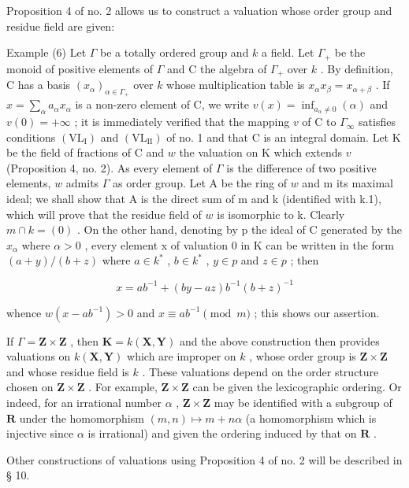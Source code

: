 Proposition 4 of no. 2 allows us to construct a valuation whose order group and residue field are given:

Example (6) Let \(\Gamma\) be a totally ordered group and \(k\) a field. Let \(\Gamma_{+}\) be the monoid of positive elements of \(\Gamma\) and C the algebra of \(\Gamma_{+}\) over \(k\) . By definition, C has a basis \((x_{\alpha})_{\alpha \in \Gamma_{+}}\) over \(k\) whose multiplication table is \(x_{\alpha}x_{\beta} = x_{\alpha +\beta}\) . If \(x = \sum_{\alpha}a_{\alpha}x_{\alpha}\) is a non-zero element of C, we write \(v(x) = \inf_{a_{\alpha}\neq 0}(\alpha)\) and \(v(0) = +\infty\) ; it is immediately verified that the mapping \(v\) of C to \(\Gamma_{\infty}\) satisfies conditions \((\mathrm{VL}_{\mathrm{I}})\) and \((\mathrm{VL}_{\mathrm{II}})\) of no. 1 and that C is an integral domain. Let K be the field of fractions of C and \(w\) the valuation on K which extends \(v\) (Proposition 4, no. 2). As every element of \(\Gamma\) is the difference of two positive elements, \(w\) admits \(\Gamma\) as order group. Let A be the ring of \(w\) and m its maximal ideal; we shall show that A is the direct sum of m and k (identified with k.1), which will prove that the residue field of \(w\) is isomorphic to k. Clearly \(m \cap k = (0)\) . On the other hand, denoting by p the ideal of C generated by the \(x_{\alpha}\) where \(\alpha > 0\) , every element x of valuation 0 in K can be written in the form \((a + y)/(b + z)\) where \(a \in k^{*}\) , \(b \in k^{*}\) , \(y \in p\) and \(z \in p\) ; then

\[
x = a b ^ {- 1} + (b y - a z) b ^ {- 1} (b + z) ^ {- 1}
\]

whence \(w(x - ab^{-1}) > 0\) and \(x \equiv ab^{-1} \pmod{m}\) ; this shows our assertion.

If \(\Gamma = \mathbf{Z} \times \mathbf{Z}\) , then \(\mathbf{K} = k(\mathbf{X}, \mathbf{Y})\) and the above construction then provides valuations on \(k(\mathbf{X}, \mathbf{Y})\) which are improper on \(k\) , whose order group is \(\mathbf{Z} \times \mathbf{Z}\) and whose residue field is \(k\) . These valuations depend on the order structure chosen on \(\mathbf{Z} \times \mathbf{Z}\) . For example, \(\mathbf{Z} \times \mathbf{Z}\) can be given the lexicographic ordering. Or indeed, for an irrational number \(\alpha\) , \(\mathbf{Z} \times \mathbf{Z}\) may be identified with a subgroup of \(\mathbf{R}\) under the homomorphism \((m, n) \mapsto m + n\alpha\) (a homomorphism which is injective since \(\alpha\) is irrational) and given the ordering induced by that on \(\mathbf{R}\) .

Other constructions of valuations using Proposition 4 of no. 2 will be described in § 10.

